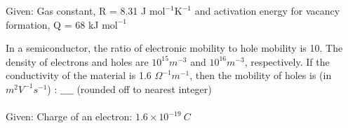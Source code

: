 Given: Gas constant, R = 8.31 J $\text{mol}^{-1}\text{K}^{-1}$ and activation energy for vacancy formation, Q = 68 kJ $\text{mol}^{-1}$ \\
\item In a semiconductor, the ratio of electronic mobility to hole mobility is 10. The density of electrons and holes are $10^{15} m^{-3}$ and $10^{16} m^{-3}$, respectively. If the conductivity of the material is 1.6 $\Omega^{-1} m^{-1}$, then the mobility of holes is (in $m^2V^{-1}s^{-1}$) : $\_\_\_\_$ (rounded off to nearest integer) \\\\
Given: Charge of an electron: $1.6 \times 10^{-19}\ C$ \\
